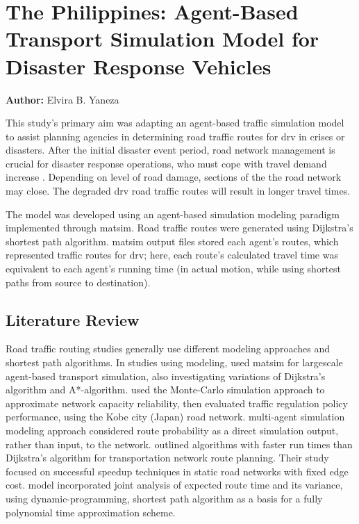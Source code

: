 \section{The Philippines: Agent-Based Transport Simulation Model for Disaster Response Vehicles}
\label{sec:philippines}
\hfill \textbf{Author:} Elvira B. Yaneza


This study's primary aim was adapting an agent-based traffic simulation model to assist planning agencies in determining road traffic routes for \gls{drv} in crises or disasters. After the initial disaster event period, road network management is crucial for disaster response operations, who must cope with travel demand increase . Depending on level of road damage, sections of the the road network may close. The degraded \gls{drv} road traffic routes will result in longer travel times.

The model was developed using an agent-based simulation modeling paradigm implemented through \gls{matsim}. Road traffic routes were generated using Dijkstra’s shortest path algorithm. \gls{matsim} output files stored each agent's routes, which represented traffic routes for \gls{drv}; here, each route's calculated travel time was equivalent to each agent's running time (in actual motion, while using shortest paths from source to destination). 

\subsection{Literature Review}
Road traffic routing studies generally use different modeling approaches and shortest path algorithms. In studies using modeling, \citet[][]{LefebvreBalmer_TechRep_IVT_2007} used \gls{matsim} for \gls{largescale} agent-based transport simulation, also investigating variations of Dijkstra’s algorithm and A*-algorithm. \citet[][]{SumaleeKurauchi_NSE_2006} used the Monte-Carlo simulation approach to approximate network capacity reliability, then evaluated  traffic regulation policy performance, using the Kobe city (Japan) road network. \citet[][]{Teknomo_TSSP_2008} multi-agent simulation modeling approach considered route probability as a direct simulation output, rather than input, to the network. \citet[][]{SandersSchultes_WEA_2007} outlined algorithms with faster run times than Dijkstra’s algorithm for transportation network route planning. Their study focused on successful speedup techniques in static road networks with fixed edge cost. \citet[][]{Elalouf_JSSM_2012} model incorporated joint analysis of expected route time and its variance, using dynamic-programming, shortest path algorithm as a basis for a fully polynomial time approximation scheme. 

